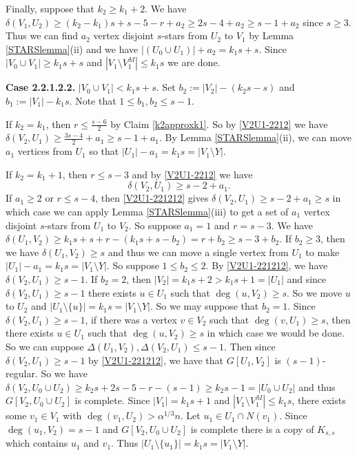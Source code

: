 \documentclass[oneside,12pt]{memoir}
\begin{document}
Finally, suppose that $k_2\geq k_1+2$.  We have $\delta(V_1, U_2)\geq (k_2-k_1)s+s-5-r+a_2\geq 2s-4+a_2\geq s-1+a_2$ since $s\geq 3$.  Thus we can find $a_2$ vertex disjoint $s$-stars from $U_2$ to $V_1$ by Lemma \ref{STARSlemma}(ii) and we have $|(U_0\cup U_1)|+a_2=k_1s+s$.  Since $|V_0\cup V_1|\geq k_1s+s$ and $|V_1\setminus V_1^M|\leq k_1s$ we are done.


\textbf{Case 2.2.1.2.2.} $|V_0\cup V_1|<k_1s+s$.  Set $b_2:=|V_2|-(k_2s-s)$ and $b_1:=|V_1|-k_1s$.  Note that  
$1\leq b_1, b_2\leq s-1$.

If $k_2=k_1$, then $r\leq \frac{s-6}{2}$ by Claim \ref{k2approxk1}. So by \eqref{V2U1-2212} we have $\delta(V_2, U_1)\geq \frac{3s-4}{2}+a_1\geq s-1+a_1$.  By Lemma \ref{STARSlemma}(ii), we can move $a_1$ vertices from $U_1$ so that $|U_1|-a_1=k_1s=|V_1\setminus Y|$.

If $k_2=k_1+1$, then $r\leq s-3$ and by \eqref{V2U1-2212} we have \begin{equation}\label{V2U1-221212}\delta(V_2, U_1)\geq s-2+a_1.\end{equation}  If $a_1\geq 2$ or $r\leq s-4$, then \eqref{V2U1-221212} gives $\delta(V_2, U_1)\geq s-2+a_1\geq s$ in which case we can apply Lemma \ref{STARSlemma}(iii) to get a set of $a_1$ vertex disjoint $s$-stars from $U_1$ to $V_2$. So suppose $a_1=1$ and $r=s-3$.  We have $\delta(U_1, V_2)\geq k_1s+s+r-(k_1s+s-b_2)=r+b_2\geq s-3+b_2$.  If $b_2\geq 3$, then we have $\delta(U_1, V_2)\geq s$ and thus we can move a single vertex from $U_1$ to make $|U_1|-a_1=k_1s=|V_1\setminus Y|$.  So suppose $1\leq b_2\leq 2$.  By \eqref{V2U1-221212}, we have $\delta(V_2, U_1)\geq s-1$. If $b_2=2$, then $|V_2|=k_1s+2>k_1s+1=|U_1|$ and since $\delta(V_2, U_1)\geq s-1$ there exists $u\in U_1$ such that $\deg(u, V_2)\geq s$. So we move $u$ to $U_2$ and $|U_1\setminus\{u\}|=k_1s=|V_1\setminus Y|$.  So we may suppose that $b_2=1$.  Since $\delta(V_2, U_1)\geq s-1$, if there was a vertex $v\in V_2$ such that $\deg(v, U_1)\geq s$, then there exists $u\in U_1$ such that $\deg(u, V_2)\geq s$ in which case we would be done.  So we can suppose $\Delta(U_1, V_2), \Delta(V_2, U_1)\leq s-1$.  Then since $\delta(V_2, U_1)\geq s-1$ by \eqref{V2U1-221212}, we have that $G[U_1, V_2]$ is $(s-1)$-regular.  So we have $\delta(V_2, U_0\cup U_2)\geq k_2s+2s-5-r-(s-1)\geq k_2s-1=|U_0\cup U_2|$ and thus $G[V_2, U_0\cup U_2]$ is complete.  Since $|V_1|=k_1s+1$ and $|V_1\setminus V_1^M|\leq k_1s$, there exists some $v_1\in V_1$ with $\deg(v_1, U_2)> \alpha^{1/3}n$.  Let $u_1\in U_1\cap N(v_1)$.  Since $\deg(u_1, V_2)=s-1$ and $G[V_2, U_0\cup U_2]$ is complete there is a copy of $K_{s,s}$ which contains $u_1$ and $v_1$.  Thus $|U_1\setminus\{u_1\}|=k_1s=|V_1\setminus Y|$.
\end{document}
